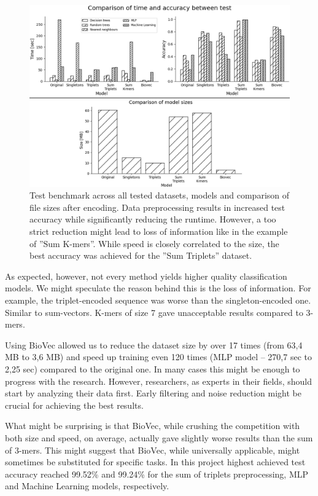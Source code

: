 \documentclass[12pt]{article}
\begin{document}
\begin{figure}[H]
\begin{center}
\includegraphics[width=\textwidth]{full_benchmark}
\caption{Test benchmark across all tested datasets, models and comparison of file sizes after encoding. Data preprocessing results in increased test accuracy while significantly reducing the runtime. However, a too strict reduction might lead to loss of information like in the example of ''Sum K-mers''. While speed is closely correlated to the size, the best accuracy was achieved for the ''Sum Triplets'' dataset.}
\end{center}
\end{figure}

As expected, however, not every method yields higher quality classification models. We might speculate the reason behind this is the loss of information. For example, the triplet-encoded sequence was worse than the singleton-encoded one. Similar to sum-vectors. K-mers of size 7 gave unacceptable results compared to 3-mers.

Using BioVec allowed us to reduce the dataset size by over 17 times (from 63,4 MB to 3,6 MB) and speed up training even 120 times (MLP model -- 270,7 sec to 2,25 sec) compared to the original one. In many cases this might be enough to progress with the research. However, researchers, as experts in their fields, should start by analyzing their data first. Early filtering and noise reduction might be crucial for achieving the best results. 

What might be surprising is that BioVec, while crushing the competition with both size and speed, on average, actually gave slightly worse results than the sum of 3-mers. This might suggest that BioVec, while universally applicable, might sometimes be substituted for specific tasks. In this project highest achieved test accuracy reached 99.52\% and 99.24\% for the sum of triplets preprocessing, MLP and Machine Learning models, respectively. 
\end{document}

